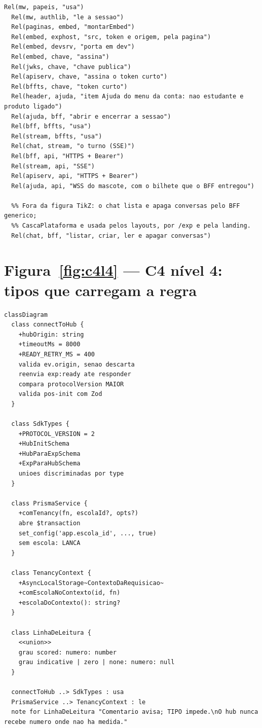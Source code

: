 \begin{lstlisting}[language=mermaid]
  Rel(mw, papeis, "usa")
  Rel(mw, authlib, "le a sessao")
  Rel(paginas, embed, "montarEmbed")
  Rel(embed, exphost, "src, token e origem, pela pagina")
  Rel(embed, devsrv, "porta em dev")
  Rel(embed, chave, "assina")
  Rel(jwks, chave, "chave publica")
  Rel(apiserv, chave, "assina o token curto")
  Rel(bffts, chave, "token curto")
  Rel(header, ajuda, "item Ajuda do menu da conta: nao estudante e produto ligado")
  Rel(ajuda, bff, "abrir e encerrar a sessao")
  Rel(bff, bffts, "usa")
  Rel(stream, bffts, "usa")
  Rel(chat, stream, "o turno (SSE)")
  Rel(bff, api, "HTTPS + Bearer")
  Rel(stream, api, "SSE")
  Rel(apiserv, api, "HTTPS + Bearer")
  Rel(ajuda, api, "WSS do mascote, com o bilhete que o BFF entregou")

  %% Fora da figura TikZ: o chat lista e apaga conversas pelo BFF generico;
  %% CascaPlataforma e usada pelos layouts, por /exp e pela landing.
  Rel(chat, bff, "listar, criar, ler e apagar conversas")
\end{lstlisting}

\section{Figura~\ref{fig:c4l4} --- C4 nível 4: tipos que carregam a regra}

\begin{lstlisting}[language=mermaid]
classDiagram
  class connectToHub {
    +hubOrigin: string
    +timeoutMs = 8000
    +READY_RETRY_MS = 400
    valida ev.origin, senao descarta
    reenvia exp:ready ate responder
    compara protocolVersion MAIOR
    valida pos-init com Zod
  }

  class SdkTypes {
    +PROTOCOL_VERSION = 2
    +HubInitSchema
    +HubParaExpSchema
    +ExpParaHubSchema
    unioes discriminadas por type
  }

  class PrismaService {
    +comTenancy(fn, escolaId?, opts?)
    abre $transaction
    set_config('app.escola_id', ..., true)
    sem escola: LANCA
  }

  class TenancyContext {
    +AsyncLocalStorage~ContextoDaRequisicao~
    +comEscolaNoContexto(id, fn)
    +escolaDoContexto(): string?
  }

  class LinhaDeLeitura {
    <<union>>
    grau scored: numero: number
    grau indicative | zero | none: numero: null
  }

  connectToHub ..> SdkTypes : usa
  PrismaService ..> TenancyContext : le
  note for LinhaDeLeitura "Comentario avisa; TIPO impede.\nO hub nunca recebe numero onde nao ha medida."
\end{lstlisting}

